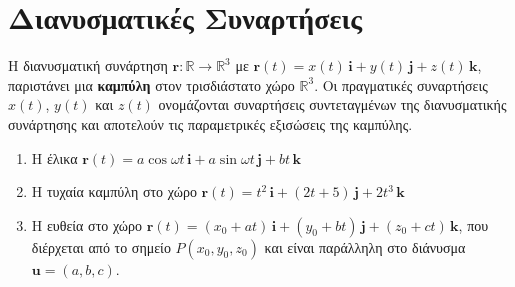 


\geometry{left=15.63mm,right=15.63mm,top=30.25mm, bottom=36.25mm,footskip=24.16mm,
  headsep=24.16mm}

\pagestyle{vangelis}
\everymath{\displaystyle}




\chapter*{Διανυσματικές Συναρτήσεις}

\begin{dfn} Η διανυσματική συνάρτηση
  $ \mathbf{r} \colon \mathbb{R} \to \mathbb{R}^{3} $ με 
  $ \mathbf{r}(t) = x(t) \, \mathbf{i}+y(t) \, \mathbf{j}+z(t) \, \mathbf{k} $, 
  παριστάνει μια \textbf{καμπύλη} στον τρισδιάστατο χώρο $ \mathbb{R}^{3} $. 
  Οι πραγματικές συναρτήσεις $ x(t) $, $ y(t) $ και $ z(t) $ ονομάζονται
  \textcolor{Col1}{συναρτήσεις συντεταγμένων} της διανυσματικής συνάρτησης και αποτελούν 
  τις παραμετρικές εξισώσεις της καμπύλης.
\end{dfn}

\begin{examples}
\item {}
  \begin{enumerate}
    \item Η έλικα $ \mathbf{r}(t)= a \cos{\omega t}\, \mathbf{i} + a \sin{\omega t}\,
      \mathbf{j} + bt \, \mathbf{k} $ 
    \item Η τυχαία καμπύλη στο χώρο 
      $ \mathbf{r}(t)=t^{2}\, \mathbf{i} + (2t+5)\, \mathbf{j} + 2t^{3} \, \mathbf{k}$ 
    \item Η ευθεία στο χώρο $ \mathbf{r}(t)=(x_{0}+at)\, \mathbf{i} + (y_{0}+bt)\,
      \mathbf{j} + (z_{0}+ct) \, \mathbf{k}$, που διέρχεται από το σημείο 
      $ P(x_{0}, y_{0}, z_{0}) $ και είναι παράλληλη στο διάνυσμα 
      $ \mathbf{u} = (a,b,c) $.
  \end{enumerate}
\end{examples}





